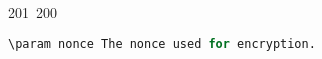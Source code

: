 201~200~\documentclass{article}
\begin{document}
\begin{lstlisting}[language=Python, caption=Decrypting a Message with ChaCha20-Poly1305]
	                                                                                                                                                                                                                                                                                                	                                                                                                                                        	    	                                                                                                	                                                                                                                                                                                                                                                                                                                                	                                                                        	                                                                        	                                                                                                                                        	                                                                                                                                                                                                                        	                                                                                                                            	                                                                	                                                                                                                                                            \param nonce The nonce used for encryption.

\end{lstlisting}
\end{document}

